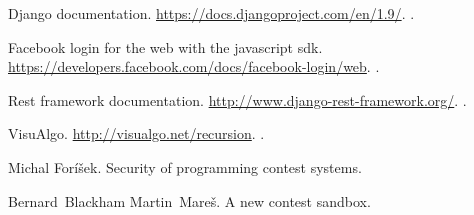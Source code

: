 \documentclass[12pt, oneside]{book}
\begin{document}

\mainmatter








%











%





\newpage

\backmatter

\thispagestyle{empty}
\nocite{*}
\clearpage





\begin{thebibliography}{1}

Django documentation.
\newblock \url{https://docs.djangoproject.com/en/1.9/}.
\newblock [2016-5-10].

Facebook login for the web with the javascript sdk.
\newblock \url{https://developers.facebook.com/docs/facebook-login/web}.
\newblock [2015-12-07].

Rest framework documentation.
\newblock \url{http://www.django-rest-framework.org/}.
\newblock [2016-5-10].

VisuAlgo.
\newblock \url{http://visualgo.net/recursion}.
\newblock [2016-5-11].

Michal Foríšek.
\newblock Security of programming contest systems.

Bernard~Blackham Martin~Mareš.
\newblock A new contest sandbox.

\end{thebibliography}



%
%
%
%
\end{document}
